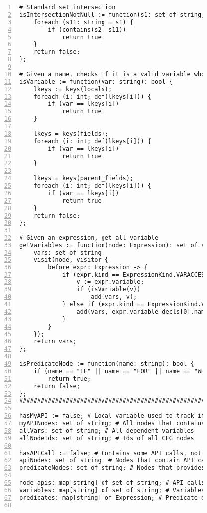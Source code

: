 \begin{figure}[ht!]
\begin{lstlisting}[numbers=left, tabsize=4, escapechar=@, caption={API Usage Mining Analysis},label={lst:aun-code}, lastline = 10]
# Standard set intersection
isIntersectionNotNull := function(s1: set of string, s2: set of string): bool {
    foreach (s11: string = s1) {
        if (contains(s2, s11))
            return true;
    }
    return false;
};

# Given a name, checks if it is a valid variable whose type is available
isVariable := function(var: string): bool {
    lkeys := keys(locals);
    foreach (i: int; def(lkeys[i])) {
        if (var == lkeys[i])
            return true;
    }
    
    lkeys = keys(fields);
    foreach (i: int; def(lkeys[i])) {
        if (var == lkeys[i])
            return true;
    }
    
    lkeys = keys(parent_fields);
    foreach (i: int; def(lkeys[i])) {
        if (var == lkeys[i])
            return true;
    }
    return false;
};

# Given an expression, get all variable
getVariables := function(node: Expression): set of string {
    vars: set of string;
    visit(node, visitor {
        before expr: Expression -> {
            if (expr.kind == ExpressionKind.VARACCESS) {
                v := expr.variable;
                if (isVariable(v))
                    add(vars, v);
            } else if (expr.kind == ExpressionKind.VARDECL) {
                add(vars, expr.variable_decls[0].name);
            }
        }
    });
    return vars;
};

isPredicateNode := function(name: string): bool {
    if (name == "IF" || name == "FOR" || name == "WHILE")
        return true;
    return false;
};
#########################################################

hasMyAPI := false; # Local variable used to track if a node contains API method of interest
myAPINodes: set of string; # All nodes that contains API methods of interest
allVars: set of string; # All dependent variables
allNodeIds: set of string; # Ids of all CFG nodes

hasAPICall := false; # Contains some API calls, not necessarily API call of interest
apiNodes: set of string; # Nodes that contain API calls
predicateNodes: set of string; # Nodes that provides predicates

node_apis: map[string] of set of string; # API calls at nodes
variables: map[string] of set of string; # Variables at nodes
predicates: map[string] of Expression; # Predicate expressions at nodes


\end{lstlisting}
\end{figure}
